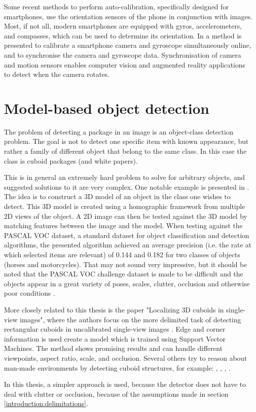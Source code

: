 Some recent methods to perform auto-calibration, specifically designed for smartphones, use the orientation sensors of the phone in conjunction with images.
Most, if not all, modern  smartphones are equipped with gyros, accelerometers, and compasses, which can be used to determine its orientation.
In \cite{jia2014online} a method is presented to calibrate a smartphone camera and gyroscope simultaneously online, and to synchronise the camera and gyroscope data.
Synchronisation of camera and motion sensors enables computer vision and augmented reality applications to detect when the camera rotates.

\section{Model-based object detection} \label{related_work:object_detection}
The problem of detecting a package in an image is an object-class detection problem.
The goal is not to detect one specific item with known appearance, but rather a family of different object that belong to the same class.
In this case the class is cuboid packages (and white papers).

This is in general an extremely hard problem to solve for arbitrary objects, and suggested solutions to it are very complex.
One notable example is presented in \cite{yan20073d}. The idea is to construct a 3D model of an object in the class one wishes to detect.
This 3D model is created using a homographic framework from  multiple 2D views of the object.
A 2D image can then be tested against the 3D model by matching features between the image and the model. 
When testing against the PASCAL VOC dataset, a standard dataset for object classification and detection algorithms, the presented algorithm achieved an average precision (i.e. the rate at which selected items are relevant) of 0.144 and 0.182 for two classes of objects (horses and motorcycles).
That may not sound very impressive, but it should be noted that the PASCAL VOC challenge dataset is made to be difficult and the objects appear in a great variety of poses, scales, clutter, occlusion and otherwise poor conditions \cite{everingham2010pascal}.

More closely related to this thesis is the paper "Localizing 3D cuboids in single-view images", where the authors focus on the more delimited task of detecting rectangular cuboids in uncalibrated single-view images \cite{xiaolocalizing}.
Edge and corner information is used create a model which is trained using Support Vector Machines.
The method shows promising results and can handle different viewpoints, aspect ratio, scale, and occlusion.
Several others try to reason about man-made environments by detecting cuboid structures, for example: \cite{hedau2010thinking}, \cite{hedau2012recovering}, \cite{gupta2010estimating}, \cite{del2012bayesian}.

In this thesis, a simpler approach is used, because the detector does not have to deal with clutter or occlusion, because of the assumptions made in section \ref{introduction:delimitations}.
